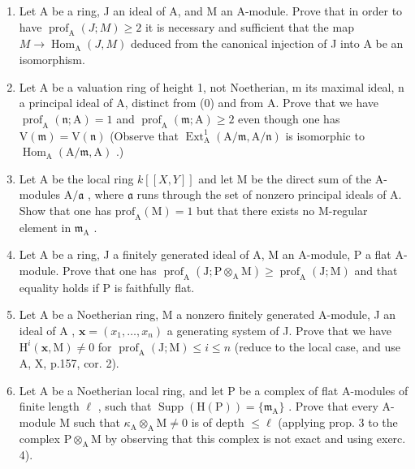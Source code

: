 
\begin{enumerate}
\def\labelenumi{\arabic{enumi})}
\item
  Let A be a ring, J an ideal of A, and M an A-module. Prove that in order to have \(\operatorname{prof}_{\mathrm{A}}(J;M)\geqslant2\) it is necessary and sufficient that the map \(M\to\operatorname{Hom}_{\mathrm{A}}(J,M)\) deduced from the canonical injection of J into A be an isomorphism.
\item
  Let A be a valuation ring of height 1, not Noetherian, m its maximal ideal, n a principal ideal of A, distinct from (0) and from A. Prove that we have \(\operatorname{prof}_{\mathrm{A}}(\mathfrak{n};\mathrm{A})=1\) and \(\operatorname{prof}_{\mathrm{A}}(\mathfrak{m};\mathrm{A})\geqslant2\) even though one has \(\mathrm{V}(\mathfrak{m})=\mathrm{V}(\mathfrak{n})\) (Observe that \(\operatorname{Ext}_{\mathrm{A}}^{1}(\mathrm{A}/\mathfrak{m},\mathrm{A}/\mathfrak{n})\) is isomorphic to \(\operatorname{Hom}_{\mathrm{A}}(\mathrm{A}/\mathfrak{m},\mathrm{A})\) .)
\item
  Let A be the local ring \(k[[X,Y]]\) and let M be the direct sum of the A-modules \(\mathrm{A}/\mathfrak{a}\) , where \(\mathfrak{a}\) runs through the set of nonzero principal ideals of A. Show that one has \(\mathrm{prof}_{\mathrm{A}}(\mathrm{M}) = 1\) but that there exists no M-regular element in \(\mathfrak{m}_{\mathrm{A}}\) .
\item
  Let A be a ring, J a finitely generated ideal of A, M an A-module, P a flat A-module. Prove that one has \(\operatorname{prof}_{\mathrm{A}}(\mathrm{J};\mathrm{P}\otimes_{\mathrm{A}}\mathrm{M})\geqslant\operatorname{prof}_{\mathrm{A}}(\mathrm{J};\mathrm{M})\) and that equality holds if P is faithfully flat.
\item
  Let \(\mathrm{A}\) be a Noetherian ring, M a nonzero finitely generated A-module, J an ideal of \(\mathrm{A}\) , \(\mathbf{x} = (x_1, \ldots, x_n)\) a generating system of J. Prove that we have \(\mathrm{H}^i(\mathbf{x}, \mathrm{M}) \neq 0\) for \(\operatorname{prof}_{\mathrm{A}}(\mathrm{J}; \mathrm{M}) \leqslant i \leqslant n\) (reduce to the local case, and use A, X, p.157, cor. 2).
\item
  Let A be a Noetherian local ring, and let P be a complex of flat A-modules of finite length \(\ell\) , such that \(\operatorname{Supp}(\mathrm{H}(\mathrm{P})) = \{\mathfrak{m}_{\mathrm{A}}\}\) . Prove that every A-module M such that \(\kappa_{\mathrm{A}} \otimes_{\mathrm{A}} \mathrm{M} \neq 0\) is of depth \(\leqslant \ell\) (applying prop. 3 to the complex \(\mathrm{P} \otimes_{\mathrm{A}} \mathrm{M}\) by observing that this complex is not exact and using exerc. 4).

\end{enumerate}
